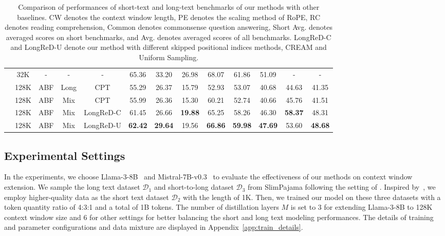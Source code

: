 \begin{table*}
{\begin{tabular}{l|cccccccccc|c|c}
 \midrule
 & 32K& -& -& -& 65.36& 33.20& 26.98
& 68.07& 61.86& 51.09& -&-\\
  & 128K& ABF& Long& CPT& 55.29& 26.37& 15.79
& 52.93& 53.07& 40.68& 44.63&41.35\\
 & 128K& ABF& Mix& CPT& 55.99& 26.36& 15.30& 60.21& 52.74& 40.66& 45.76&41.51\\
 & 128K& ABF& Mix& LongReD-C& 61.45& 26.66& \textbf{19.88}
& 65.25& 58.26& 46.30& \textbf{58.37}&48.31\\
  & 128K& ABF& Mix& LongReD-U& \textbf{62.42}& \textbf{29.64}& 19.56& \textbf{66.86}& \textbf{59.98}& \textbf{47.69}& 53.60&\textbf{48.68}\\
 \bottomrule
    \end{tabular}}
    \caption{Comparison of performances of short-text and long-text benchmarks of our methods with other baselines. CW denotes the context window length, PE denotes the scaling method of RoPE, RC denotes reading comprehension, Common denotes commonsense question answering, Short Avg. denotes averaged scores on short benchmarks, and Avg. denotes averaged scores of all benchmarks. LongReD-C and LongReD-U denote our method with different skipped positional indices methods, \ie CREAM and Uniform Sampling.}
    \label{tab:results}
\end{table*}
\subsection{Experimental Settings}

In the experiments, we choose Llama-3-8B~\cite{Dubey-arxiv-2023-llama3} and Mistral-7B-v0.3~\cite{jiang-arxiv-2023-mistral} to evaluate the effectiveness of our methods on context window extension. 
We sample the long text dataset $\mathcal{D}_1$ and short-to-long dataset $\mathcal{D}_3$ from SlimPajama following the setting of \citet{fu-icml-2024-data}. Inspired by~\citet{gao-arxiv-2024-how}, we employ higher-quality data as the short text dataset $\mathcal{D}_2$ with the length of 1K. Then, we trained our model on these three datasets with a token quantity ratio of 4:3:1 and a total of 1B tokens. The number of distillation layers $M$ is set to 3 for extending Llama-3-8B to 128K context window size and 6 for other settings for better balancing the short and long text modeling performances.
The details of training and parameter configurations and data mixture are displayed in Appendix~\ref{app:train_details}.



